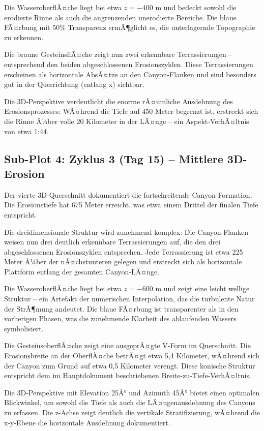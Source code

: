 ﻿\documentclass[12pt,a4paper]{report}
\begin{document}
Die WasseroberflÃ¤che liegt bei etwa $z = -400$ m und bedeckt sowohl die erodierte Rinne als auch die angrenzenden unerodierte Bereiche. Die blaue FÃ¤rbung mit 50\% Transparenz ermÃ¶glicht es, die unterlagernde Topographie zu erkennen.

Die braune GesteinsflÃ¤che zeigt nun zwei erkennbare Terrassierungen -- entsprechend den beiden abgeschlossenen Erosionszyklen. Diese Terrassierungen erscheinen als horizontale AbsÃ¤tze an den Canyon-Flanken und sind besonders gut in der Querrichtung (entlang x) sichtbar.

Die 3D-Perspektive verdeutlicht die enorme rÃ¤umliche Ausdehnung des Erosionsprozesses: WÃ¤hrend die Tiefe auf 450 Meter begrenzt ist, erstreckt sich die Rinne Ã¼ber volle 20 Kilometer in der LÃ¤nge -- ein Aspekt-VerhÃ¤ltnis von etwa 1:44.

\subsection{Sub-Plot 4: Zyklus 3 (Tag 15) -- Mittlere 3D-Erosion}

Der vierte 3D-Querschnitt dokumentiert die fortschreitende Canyon-Formation. Die Erosionstiefe hat 675 Meter erreicht, was etwa einem Drittel der finalen Tiefe entspricht.

Die dreidimensionale Struktur wird zunehmend komplex: Die Canyon-Flanken weisen nun drei deutlich erkennbare Terrassierungen auf, die den drei abgeschlossenen Erosionszyklen entsprechen. Jede Terrassierung ist etwa 225 Meter Ã¼ber der nÃ¤chstunteren gelegen und erstreckt sich als horizontale Plattform entlang der gesamten Canyon-LÃ¤nge.

Die WasseroberflÃ¤che liegt bei etwa $z = -600$ m und zeigt eine leicht wellige Struktur -- ein Artefakt der numerischen Interpolation, das die turbulente Natur der StrÃ¶mung andeutet. Die blaue FÃ¤rbung ist transparenter als in den vorherigen Phasen, was die zunehmende Klarheit des ablaufenden Wassers symbolisiert.

Die GesteinsoberflÃ¤che zeigt eine ausgeprÃ¤gte V-Form im Querschnitt. Die Erosionsbreite an der OberflÃ¤che betrÃ¤gt etwa 5,4 Kilometer, wÃ¤hrend sich der Canyon zum Grund auf etwa 0,5 Kilometer verengt. Diese konische Struktur entspricht dem im Hauptdokument beschriebenen Breite-zu-Tiefe-VerhÃ¤ltnis.

Die 3D-Perspektive mit Elevation 25Â° und Azimuth 45Â° bietet einen optimalen Blickwinkel, um sowohl die Tiefe als auch die LÃ¤ngenausdehnung des Canyons zu erfassen. Die z-Achse zeigt deutlich die vertikale Stratifizierung, wÃ¤hrend die x-y-Ebene die horizontale Ausdehnung dokumentiert.
\end{document}
